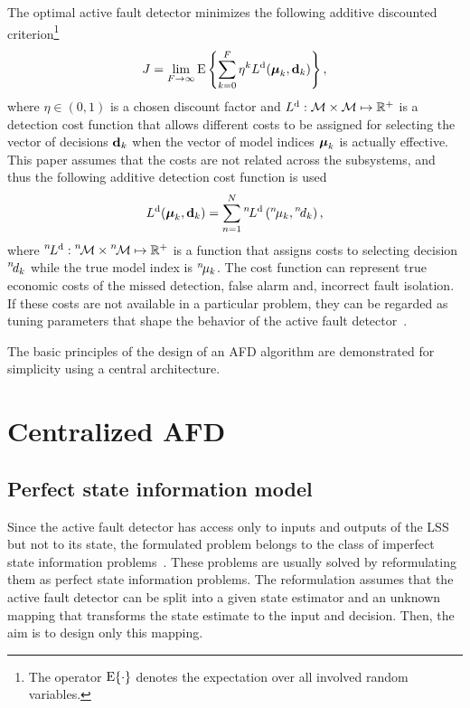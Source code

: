 \documentclass[conference,letterpaper]{IEEEtran}
\def\nth{\prescript{n\!}{}}
\begin{document}
The optimal active fault detector minimizes the following additive discounted criterion\footnote{The operator $\operatorname*{E}\{\cdot\}$ denotes the expectation over all involved random variables.}
\begin{align} \label{ali:criterion}
	J = \lim_{F\to\infty} \operatorname*{E} \left\{ \sum_{k=0}^{F} \eta^{k} L^{\mathrm{d}}(\boldsymbol{\mu}_{k},\mathbf{d}_{k})\right\},
\end{align}
where $\eta\in(0,1)$ is a chosen discount factor and $L^{\mathrm{d}}:\mathcal{M}\times\mathcal{M}\mapsto\mathbb{R}^{+}$ is a detection cost function that allows different costs to be assigned for selecting the vector of decisions $\mathbf{d}_{k}$ when the vector of model indices $\boldsymbol{\mu}_{k}$ is actually effective.
This paper assumes that the costs are not related across the subsystems, and thus the following additive detection cost function is used
\begin{align}
	L^{\mathrm{d}}(\bfmu_{k},\bfd_{k}) = \sum_{n=1}^{N} \nth{L}^{\mathrm{d}} \left(\nth{\mu}_{k},\nth{d}_{k} \right), \label{ali:additiveCostFunction}
\end{align}
where $\nth{L}^{\mathrm{d}}:\nth{\mcM}\times\nth{\mcM}\mapsto\bbR^{+}$ is a function that assigns costs to selecting decision $\nth{d}_{k}$ while the true model index is $\nth{\mu}_{k}$. 
The cost function can represent true economic costs of the missed detection, false alarm and, incorrect fault isolation. 
If these costs are not available in a particular problem, they can be regarded as tuning parameters that shape the behavior of the active fault detector~\cite{Puncochar2014:ja:AMCS}.

The basic principles of the design of an AFD algorithm are demonstrated for simplicity using a central architecture.
\section{Centralized AFD}\label{sec:centralized_afd}
\subsection{Perfect state information model}\label{sec:perfectStateInformationModel}
Since the active fault detector has access only to inputs and outputs of the LSS but not to its state, the formulated problem belongs to the class of imperfect state information problems~\cite{Bertsekas2012:b}. 
These problems are usually solved by reformulating them as perfect state information problems. 
The reformulation assumes that the active fault detector can be split into a given state estimator and an unknown mapping that transforms the state estimate to the input and decision. 
Then, the aim is to design only this mapping.
\end{document}
